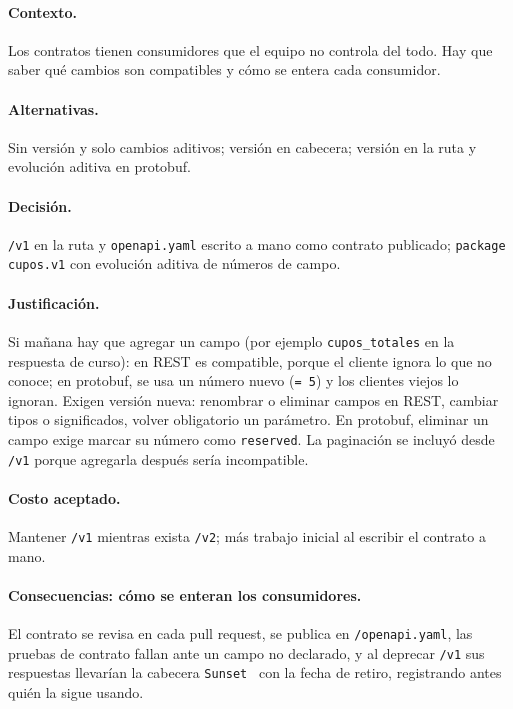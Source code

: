 \documentclass[11pt,spanish]{article}
\begin{document}
\paragraph{Contexto.} Los contratos tienen consumidores que el equipo no controla del todo. Hay que saber qué cambios son compatibles y cómo se entera cada consumidor.

\paragraph{Alternativas.} Sin versión y solo cambios aditivos; versión en cabecera; versión en la ruta y evolución aditiva en protobuf.

\paragraph{Decisión.} \texttt{/v1} en la ruta y \texttt{openapi.yaml} escrito a mano como contrato publicado; \texttt{package cupos.v1} con evolución aditiva de números de campo.

\paragraph{Justificación.} Si mañana hay que agregar un campo (por ejemplo \texttt{cupos\_totales} en la respuesta de curso): en REST es compatible, porque el cliente ignora lo que no conoce; en protobuf, se usa un número nuevo (\texttt{= 5}) y los clientes viejos lo ignoran. Exigen versión nueva: renombrar o eliminar campos en REST, cambiar tipos o significados, volver obligatorio un parámetro. En protobuf, eliminar un campo exige marcar su número como \texttt{reserved}. La paginación se incluyó desde \texttt{/v1} porque agregarla después sería incompatible.

\paragraph{Costo aceptado.} Mantener \texttt{/v1} mientras exista \texttt{/v2}; más trabajo inicial al escribir el contrato a mano.

\paragraph{Consecuencias: cómo se enteran los consumidores.} El contrato se revisa en cada pull request, se publica en \texttt{/openapi.yaml}, las pruebas de contrato fallan ante un campo no declarado, y al deprecar \texttt{/v1} sus respuestas llevarían la cabecera \texttt{Sunset}~\cite{rfc8594} con la fecha de retiro, registrando antes quién la sigue usando.
\end{document}
